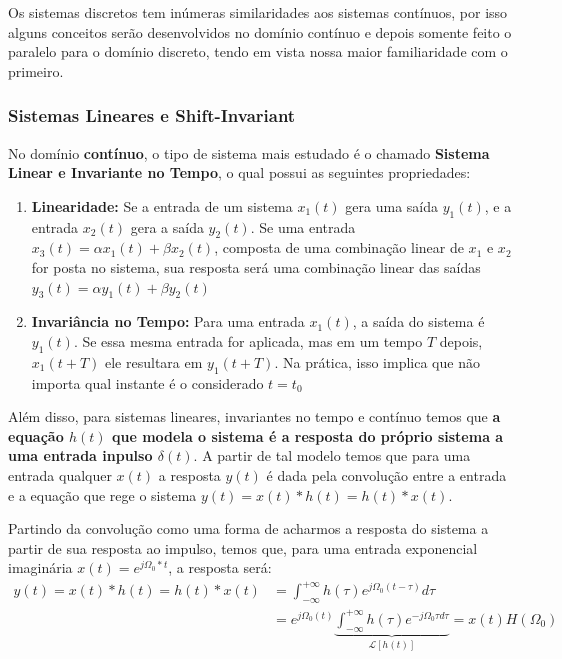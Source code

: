\documentclass{article}
\begin{document}
Os sistemas discretos tem inúmeras similaridades aos sistemas contínuos, por isso alguns conceitos serão desenvolvidos no domínio contínuo e depois somente feito o paralelo para o domínio discreto, tendo em vista nossa maior familiaridade com o primeiro.

\subsubsection{Sistemas Lineares e Shift-Invariant}
No domínio \textbf{contínuo}, o tipo de sistema mais estudado é o chamado \textbf{Sistema Linear e Invariante no Tempo}, o qual possui as seguintes propriedades:
\begin{enumerate}
    \item \textbf{Linearidade:} Se a entrada de um sistema $x_1(t)$ gera uma saída $y_1(t)$, e a entrada $x_2(t)$ gera a saída $y_2(t)$. Se uma entrada $x_3(t) = \alpha x_1(t) + \beta x_2(t)$, composta de uma combinação linear de $x_1$ e $x_2$ for posta no sistema, sua resposta será uma combinação linear das saídas $y_3(t) = \alpha y_1(t) + \beta y_2(t)$
    \item \textbf{Invariância no Tempo:} Para uma entrada $x_1(t)$, a saída do sistema é $y_1(t)$. Se essa mesma entrada for aplicada, mas em um tempo $T$ depois, $x_1(t + T)$ ele resultara em $y_1(t + T)$. Na prática, isso implica que não importa qual instante é o considerado $t = t_0$
\end{enumerate}

Além disso, para sistemas lineares, invariantes no tempo e contínuo temos que \textbf{a equação  $h(t)$ que modela o sistema é a resposta do próprio sistema a uma entrada inpulso $\delta (t)$}. A partir de tal modelo temos que para uma entrada qualquer $x(t)$ a resposta $y(t)$ é dada pela convolução entre a entrada e a equação que rege o sistema $y(t) = x(t) * h(t) = h(t) * x(t)$.

Partindo da convolução como uma forma de acharmos a resposta do sistema a partir de sua resposta ao impulso, temos que, para uma entrada exponencial imaginária $x(t) = e^{j \Omega_0 * t}$, a resposta será:
\begin{align*}
    y(t) = x(t) \ast h(t) = h(t) \ast x(t) &= \int^{+\infty}_{-\infty} h(\tau) e^{j\Omega_0 (t-\tau)} d\tau \\
    &= e^{j\Omega_0 (t)} \underbrace{\int^{+\infty}_{-\infty} h(\tau) e^{-j\Omega_0 \tau d\tau}}_{\mathcal{L}[h(t)]} = x(t) H(\Omega_0)
\end{align*}
\end{document}
